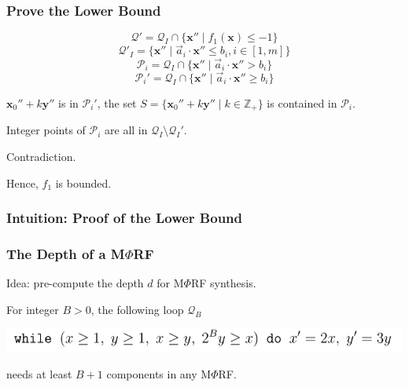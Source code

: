 \documentclass[11pt]{beamer}
\begin{document}
\begin{frame}\frametitle{Prove the Lower Bound}

\[\mathcal{Q}' = \mathcal{Q}_I\cap \{\textbf{x}''\mid f_1(\textbf{x}) \le -1\}\]
\[\mathcal{Q}'_I = \{\textbf{x}'' \mid \vec{a}_i\cdot \textbf{x}'' \le b_i, i \in [1, m]\}\]
\[\mathcal{P}_i = \mathcal{Q}_I \cap \{\textbf{x}''\mid \vec{a}_i \cdot \textbf{x}'' > b_i\}\]
\[\mathcal{P}_i' = \mathcal{Q}_I \cap \{\textbf{x}''\mid \vec{a}_i \cdot \textbf{x}'' \ge b_i\}\]

$\textbf{x}_0'' + k\textbf{y}''$ is in $\mathcal{P}_i'$, the set $S = \{\textbf{x}_0'' + k\textbf{y}''\mid k \in \mathbb{Z}_+\}$ is contained in $\mathcal{P}_i$.

Integer points of $\mathcal{P}_i$ are all in $\mathcal{Q}_I\setminus \mathcal{Q}_I'$.

Contradiction.

Hence, $f_1$ is bounded.
\end{frame}


\begin{frame}\frametitle{Intuition: Proof of the Lower Bound}

\end{frame}



\begin{frame}\frametitle{The Depth of a M$\Phi$RF}
Idea: pre-compute the depth $d$ for M$\Phi$RF synthesis.

\begin{theorem}[5]
For integer $B > 0$, the following loop $\mathcal{Q}_B$
\begin{center}
\includegraphics[scale=0.5]{5.PNG}
\end{center}
needs at least $B + 1$ components in any M$\Phi$RF.
\end{theorem}

\end{frame}
\end{document}

